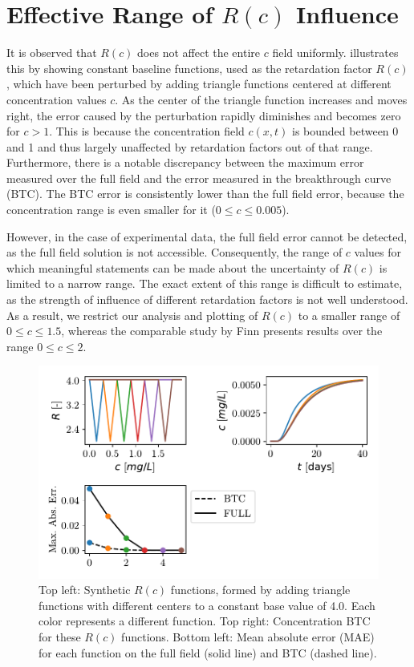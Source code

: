 \section*{Effective Range of $R(c)$ Influence}
\label{app:supplementary}
It is observed that $R(c)$ does not affect the entire $c$ field uniformly.  illustrates this by showing constant baseline functions, used as the retardation factor $R(c)$, which have been perturbed by adding triangle functions centered at different concentration values $c$. As the center of the triangle function increases and moves right, the error caused by the perturbation rapidly diminishes and becomes zero for $c > 1$. This is because the concentration field $c(x,t)$ is bounded between 0 and 1 and thus largely unaffected by retardation factors out of that range.
Furthermore, there is a notable discrepancy between the maximum error measured over the full field and the error measured in the breakthrough curve (BTC). The BTC error is consistently lower than the full field error, because the concentration range is even smaller for it ($0 \leq c \leq 0.005$).

However, in the case of experimental data, the full field error cannot be detected, as the full field solution is not accessible. Consequently, the range of $c$ values for which meaningful statements can be made about the uncertainty of $R(c)$ is limited to a narrow range. The exact extent of this range is difficult to estimate, as the strength of influence of different retardation factors is not well understood.
As a result, we restrict our analysis and plotting of $R(c)$ to a smaller range of $0 \leq c \leq 1.5$, whereas the comparable study by Finn \cite{finn} presents results over the range $0 \leq c \leq 2$.

\begin{figure}[h]
    \centering
    \includegraphics{figs/triangle_ret_pertubation.pdf}
    \caption{Top left: Synthetic $R(c)$ functions, formed by adding triangle functions with different centers to a constant base value of 4.0. Each color represents a different function. Top right: Concentration BTC for these $R(c)$ functions. Bottom left: Mean absolute error (MAE) for each function on the full field (solid line) and BTC (dashed line).}
    \label{fig:triangle_ret_pertubation}
\end{figure}
